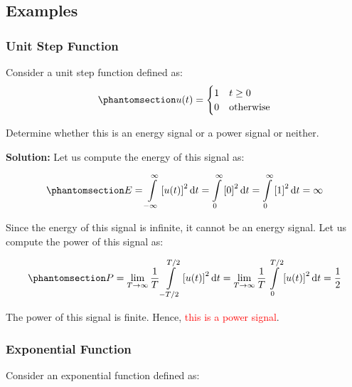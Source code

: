 \documentclass[
  14pt,
  a4paper,
  oneside,
  open=any,
  a4paper,
  14pt]{report}
\begin{document}
\subsection{Examples}\label{examples}

\subsubsection{Unit Step Function}\label{unit-step-function}

Consider a unit step function defined as:
\begin{equation}\phantomsection\label{eq-unit-step-function-example}{
    u(t) =         
    \begin{cases}             
        1 & t \geq 0         \\             
        0 & \text{otherwise}         
    \end{cases}
}\end{equation}

Determine whether this is an energy signal or a power signal or neither.

\textbf{Solution:} Let us compute the energy of this signal as:

\begin{equation}\phantomsection\label{eq-unit-step-energy}{
    E = \int\limits_{-\infty}^{\infty} {[u(t)]}^2 \odif{t} = \int\limits_{0}^{\infty} {[0]}^2 \odif{t} = \int\limits_{0}^{\infty} {[1]}^2 \odif{t} = \infty 
}\end{equation}

Since the energy of this signal is infinite, it cannot be an energy
signal. Let us compute the power of this signal as:

\begin{equation}\phantomsection\label{eq-unit-step-power}{
    P = \lim\limits_{T \to \infty} \dfrac{1}{T} \int\limits_{-T/2}^{T/2} {[u(t)]}^2 \odif{t} = \lim\limits_{T \to \infty} \dfrac{1}{T} \int\limits_{0}^{T/2} {[u(t)]}^2 \odif{t} = \dfrac{1}{2}
}\end{equation}

The power of this signal is finite. Hence, \textcolor{red}{this is a
power signal}.

\subsubsection{Exponential Function}\label{exponential-function}

Consider an exponential function defined as:
\end{document}
